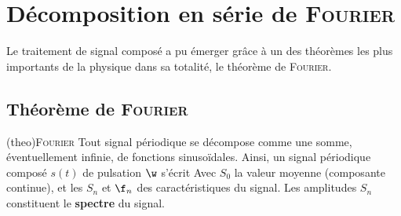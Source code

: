 \documentclass[../../main/main.tex]{subfiles}
\begin{document}
%

\section{Décomposition en série de \textsc{Fourier}}
Le traitement de signal composé a pu émerger grâce à un des théorèmes les plus
importants de la physique dans sa totalité, le théorème de \textsc{Fourier}.
\vspace{-15pt}

\subsection{Théorème de \textsc{Fourier}}
\begin{tcb*}[breakable](theo){\textsc{Fourier}}
	Tout signal périodique se décompose comme une somme, éventuellement infinie,
	de fonctions sinusoïdales. Ainsi, un signal périodique composé $s(t)$ de
	pulsation $\w$ s'écrit
	\psw{%
		\[
			s(t) = S_0 + \sum_{n=1}^{+\infty} s_n(t)
			\Lra
			s(t) = S_0 + \sum_{n=1}^{+\infty} S_n \cos(n\w t + \f_n)
		\]
	}%
	Avec $S_0$ la valeur moyenne (composante continue), et les $S_n$ et $\f_n$ des
	caractéristiques du signal. Les amplitudes $S_n$ constituent le
	\textbf{spectre} du signal.
\end{tcb*}
\end{document}
